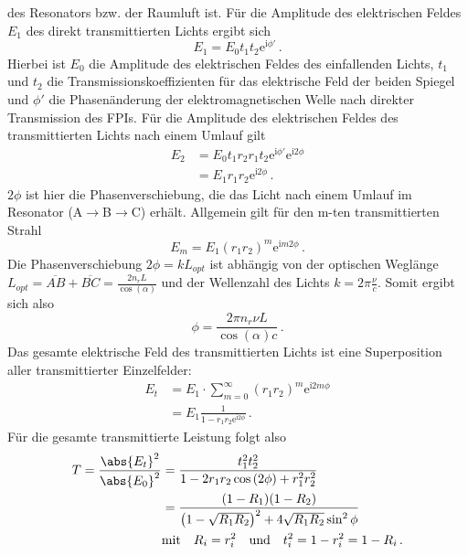 des Resonators bzw. der Raumluft ist. Für die Amplitude des elektrischen Feldes
$E_1$ des direkt transmittierten Lichts ergibt sich
\begin{equation}\label{eq:FPI_E1}
	E_1=E_0t_1t_2\mathrm{e}^{\mathrm{i}\phi'}\,.
\end{equation}
Hierbei ist $E_0$ die Amplitude des elektrischen Feldes des einfallenden Lichts,
$t_1$ und $t_2$ die Transmissionskoeffizienten für das elektrische Feld
der beiden Spiegel und $\phi'$ die Phasenänderung der elektromagnetischen Welle
nach direkter Transmission des FPIs. Für die Amplitude des elektrischen Feldes des
transmittierten Lichts nach einem Umlauf gilt
\begin{equation}\label{eq:FPI_E2}
	\begin{split}
		E_2
		&=E_0t_1r_2r_1t_2\mathrm{e}^{\mathrm{i}\phi'}\mathrm{e}^{\mathrm{i}2\phi}\\
		&=E_1r_1r_2\mathrm{e}^{\mathrm{i}2\phi}\,.
	\end{split}
\end{equation}
$2\phi$ ist hier die Phasenverschiebung, die das Licht nach einem Umlauf im
Resonator (A$\rightarrow$B$\rightarrow$C) erhält. Allgemein gilt für den m-ten
transmittierten Strahl
\begin{equation}\label{eq:FPI_Em}
	E_m=E_1(r_1r_2)^m\mathrm{e}^{\mathrm{i}m2\phi}\,.
\end{equation}
Die Phasenverschiebung $2\phi=kL_{opt}$ ist abhängig von der optischen Weglänge
$L_{opt}=\overline{AB}+\overline{BC}=\frac{2n_rL}{\cos{(\alpha)}}$ und der Wellenzahl des
Lichts $k=2\pi\frac{\nu}{c}$. Somit ergibt sich also
\begin{equation}\label{eq:FPI_phase}
	\phi=\frac{2\pi n_r\nu L}{\cos{(\alpha)}c}\,.
\end{equation}
Das gesamte elektrische Feld des transmittierten Lichts ist eine Superposition
aller transmittierter Einzelfelder:
\begin{equation}\label{eq:FPI_Et}
	\begin{split}
		E_t
		&=E_1\cdot\sum\limits_{m=0}^\infty(r_1r_2)^m\mathrm{e}^{\mathrm{i}2m\phi}\\
		&=E_1\frac{1}{1-r_1r_2\mathrm{e}^{\mathrm{i}2\phi}}\,.
	\end{split}
\end{equation}
Für die gesamte transmittierte Leistung folgt also
\begin{equation}\label{eq:FPI_transmission}
	\begin{split}
		T=\frac{\abs{E_t}^2}{\abs{E_0}^2}
		&=\frac{t_1^2t_2^2}{1-2r_1r_2\cos{(2\phi)}+r_1^2r_2^2}\\
		&=\frac{(1-R_1)(1-R_2)}{\left(1-\sqrt{R_1R_2}\right)^2+4\sqrt{R_1R_2}\sin^2{\phi}}\\
		&\text{mit}\quad
		R_i=r_i^2
		\quad\text{und}\quad
		t_i^2=1-r_i^2=1-R_i\,.
	\end{split}
\end{equation}
